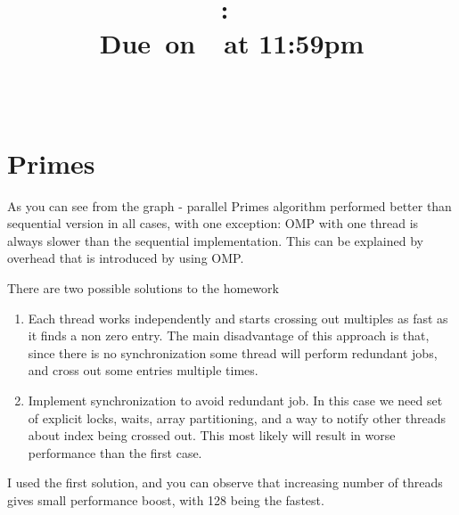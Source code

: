\documentclass{article}
\title{
    \vspace{2in}
    \textmd{\textbf{\hmwkClass:\ \hmwkTitle}}\\
        \normalsize\vspace{0.1in}\small{Due\ on\ \hmwkDueDate\ at 11:59pm}\\
        \vspace{0.1in}\large{\textit{\hmwkClassInstructor\ \hmwkClassTime}}
    \vspace{3in}
}
\author{\textbf{\hmwkAuthorName}}
\date{}
\begin{document}
\maketitle

\pagebreak

\section{\textbf{Primes}}
As you can see from the graph - parallel Primes algorithm performed better than sequential
version in all cases, with
one exception: OMP with one thread is always slower than the sequential implementation. 
This can be explained by overhead that is introduced by using OMP.

There are two possible solutions to the homework
\begin{enumerate}[1.]
\item Each thread works independently and starts crossing out multiples as fast as it finds a
non zero entry. The main disadvantage of this approach is that, since there is no
synchronization some thread will perform redundant jobs, and cross out some entries multiple
times.
\item Implement synchronization to avoid redundant job. In this case we need set of explicit
locks, waits, array partitioning, and a way to notify other threads about index being crossed out.
This most likely will result in worse performance than the first case.
\end{enumerate}

I used the first solution, and you can observe that increasing number of threads gives small
performance boost, with 128 being the fastest.\\
\end{document}

